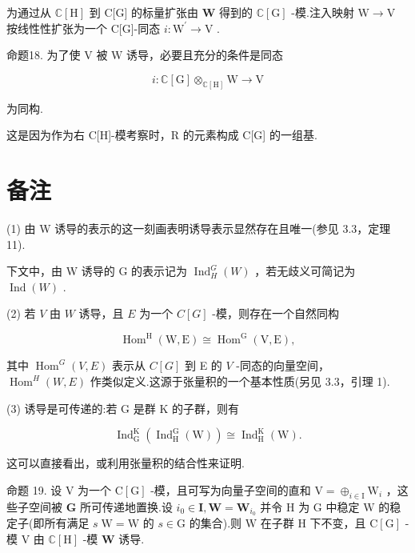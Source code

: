 \documentclass[10pt]{article}
\begin{document}
为通过从 \(\mathbb{C}\left\lbrack  \mathrm{H}\right\rbrack\) 到 C[G] 的标量扩张由 \(\mathbf{W}\) 得到的 \(\mathbb{C}\left\lbrack  \mathrm{G}\right\rbrack\) -模.注入映射 \(\mathrm{W} \rightarrow  \mathrm{V}\) 按线性性扩张为一个 C[G]-同态 \(i : {\mathrm{W}}^{\prime } \rightarrow  \mathrm{V}\) .

命题18. 为了使 \(\mathrm{V}\) 被 \(\mathrm{W}\) 诱导，必要且充分的条件是同态

\[
i : \mathbb{C}\left\lbrack  \mathrm{G}\right\rbrack  { \otimes  }_{\mathbb{C}\left\lbrack  \mathrm{H}\right\rbrack  }\mathrm{W} \rightarrow  \mathrm{V}
\]

为同构.

这是因为作为右 C[H]-模考察时，R 的元素构成 C[G] 的一组基.

\section*{备注}

(1) 由 W 诱导的表示的这一刻画表明诱导表示显然存在且唯一(参见 3.3，定理 11).

下文中，由 W 诱导的 G 的表示记为 \({\operatorname{Ind}}_{H}^{G}\left( W\right)\) ，若无歧义可简记为 \(\operatorname{Ind}\left( W\right)\) .

(2) 若 \(V\) 由 \(W\) 诱导，且 \(E\) 为一个 \(C\left\lbrack  G\right\rbrack\) -模，则存在一个自然同构

\[
{\operatorname{Hom}}^{\mathrm{H}}\left( {\mathrm{W},\mathrm{E}}\right)  \cong  {\operatorname{Hom}}^{\mathrm{G}}\left( {\mathrm{V},\mathrm{E}}\right) ,
\]

其中 \({\operatorname{Hom}}^{G}\left( {V,E}\right)\) 表示从 \(C\left\lbrack  G\right\rbrack\) 到 E 的 \(V\) -同态的向量空间， \({\operatorname{Hom}}^{H}\left( {W,E}\right)\) 作类似定义.这源于张量积的一个基本性质(另见 3.3，引理 1).

(3) 诱导是可传递的:若 \(\mathrm{G}\) 是群 \(\mathrm{K}\) 的子群，则有

\[
{\operatorname{Ind}}_{\mathrm{G}}^{\mathrm{K}}\left( {{\operatorname{Ind}}_{\mathrm{H}}^{\mathrm{G}}\left( \mathrm{W}\right) }\right)  \cong  {\operatorname{Ind}}_{\mathrm{H}}^{\mathrm{K}}\left( \mathrm{W}\right) .
\]

这可以直接看出，或利用张量积的结合性来证明.

命题 19. 设 \(\mathrm{V}\) 为一个 \(\mathrm{C}\left\lbrack  \mathrm{G}\right\rbrack\) -模，且可写为向量子空间的直和 \(\mathrm{V} = { \oplus  }_{i \in  \mathrm{I}}{\mathrm{W}}_{i}\) ，这些子空间被 \(\mathbf{G}\) 所可传递地置换.设 \({i}_{0} \in  \mathbf{I},\mathbf{W} = {\mathbf{W}}_{{i}_{0}}\) 并令 \(\mathrm{H}\) 为 \(\mathrm{G}\) 中稳定 \(\mathrm{W}\) 的稳定子(即所有满足 \(s\mathrm{\;W} = \mathrm{W}\) 的 \(s \in  \mathrm{G}\) 的集合).则 \(\mathrm{W}\) 在子群 \(\mathrm{H}\) 下不变，且 \(\mathrm{C}\left\lbrack  \mathrm{G}\right\rbrack\) -模 \(\mathrm{V}\) 由 \(\mathbb{C}\left\lbrack  \mathrm{H}\right\rbrack\) -模 \(\mathbf{W}\) 诱导.
\end{document}
